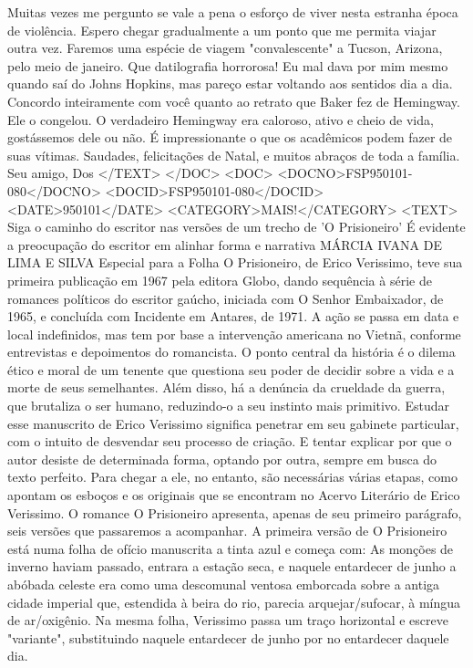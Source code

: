 Muitas vezes me pergunto se vale a pena o esforço de viver nesta estranha época de violência.
Espero chegar gradualmente a um ponto que me permita viajar outra vez. Faremos uma espécie de viagem "convalescente" a Tucson, Arizona, pelo meio de janeiro.
Que datilografia horrorosa! Eu mal dava por mim mesmo quando saí do Johns Hopkins, mas pareço estar voltando aos sentidos dia a dia.
Concordo inteiramente com você quanto ao retrato que Baker fez de Hemingway. Ele o congelou. O verdadeiro Hemingway era caloroso, ativo e cheio de vida, gostássemos dele ou não. É impressionante o que os acadêmicos podem fazer de suas vítimas.
 Saudades, felicitações de Natal, e muitos abraços de toda a família. Seu amigo,
Dos
</TEXT>
</DOC>
<DOC>
<DOCNO>FSP950101-080</DOCNO>
<DOCID>FSP950101-080</DOCID>
<DATE>950101</DATE>
<CATEGORY>MAIS!</CATEGORY>
<TEXT>
Siga o caminho do escritor nas versões de um trecho de 'O Prisioneiro' 
É evidente a preocupação do escritor em alinhar forma e narrativa 
MÁRCIA IVANA DE LIMA E SILVA 
Especial para a Folha 
O Prisioneiro, de Erico Verissimo, teve sua primeira publicação em 1967 pela editora Globo, dando sequência à série de romances políticos do escritor gaúcho, iniciada com  O Senhor Embaixador, de 1965, e concluída com  Incidente em Antares, de 1971. A ação se passa em data e local indefinidos, mas tem por base a intervenção americana no Vietnã, conforme entrevistas e depoimentos do romancista. O ponto central da história é o dilema ético e moral de um tenente que questiona seu poder de decidir sobre a vida e a morte de seus semelhantes. Além disso, há a denúncia da crueldade da guerra, que brutaliza o ser humano, reduzindo-o a seu instinto mais primitivo.
Estudar esse manuscrito de Erico Verissimo significa penetrar em seu gabinete particular, com o intuito de desvendar seu processo de criação. E tentar explicar por que o autor desiste de determinada forma, optando por outra, sempre em busca do texto perfeito. Para chegar a ele, no entanto, são necessárias várias etapas, como apontam os esboços e os originais que se encontram no Acervo Literário de Erico Verissimo. O romance  O Prisioneiro apresenta, apenas de seu primeiro parágrafo, seis versões que passaremos a acompanhar.
A primeira versão de  O Prisioneiro está numa folha de ofício manuscrita a tinta azul e começa com:  As monções de inverno haviam passado, entrara a estação seca, e naquele entardecer de junho a abóbada celeste era como uma descomunal ventosa emborcada sobre a antiga cidade imperial que, estendida à beira do rio, parecia arquejar/sufocar, à míngua de ar/oxigênio. Na mesma folha, Verissimo passa um traço horizontal e escreve "variante", substituindo  naquele entardecer de junho por  no entardecer daquele dia.
